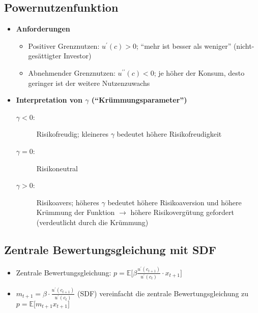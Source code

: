 \subsection{Powernutzenfunktion}
\begin{itemize}
	\item \textbf{Anforderungen}
	\begin{itemize}
		\item Positiver Grenznutzen: \(u^\prime(c)>0\); "`mehr ist besser als weniger"' (nicht-gesättigter Investor)
		\item Abnehmender Grenznutzen: \(u^{\prime\prime}(c)<0\); je höher der Konsum, desto geringer ist der weitere Nutzenzuwachs
	\end{itemize}
	\item \textbf{Interpretation von \(\gamma\) ("`Krümmungsparameter"')}
	\begin{description}
		\item[\(\gamma<0\):] Risikofreudig; kleineres \(\gamma\) bedeutet höhere Risikofreudigkeit
		\item[\(\gamma=0\):] Risikoneutral
		\item[\(\gamma>0\):] Risikoavers; höheres \(\gamma\) bedeutet höhere Risikoaversion und höhere Krümmung der Funktion \(\rightarrow\) höhere Risikovergütung gefordert (verdeutlicht durch die Krümmung)
	\end{description}
\end{itemize}

\subsection{Zentrale Bewertungsgleichung mit SDF}
\begin{itemize}
	\item Zentrale Bewertungsgleichung: \(p=\mathbb{E} \big\lbrack \beta \frac{u^\prime(c_{t+1})}{u^\prime(c_t)} \cdot x_{t+1} \big\rbrack\)
	\item \(m_{t+1} = \beta \cdot \frac{u^\prime(c_{t+1})}{u^\prime(c_t)}\) (SDF) vereinfacht die zentrale Bewertungsgleichung zu \(p=\mathbb{E} \big\lbrack m_{t+1} x_{t+1} \big\rbrack\)
\end{itemize}

